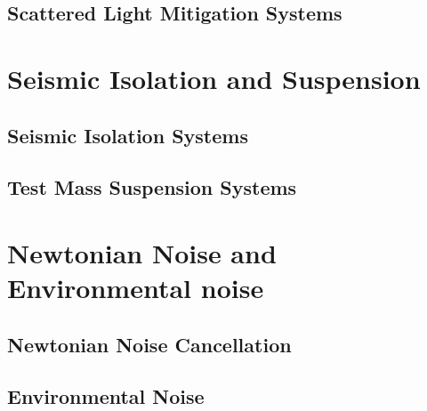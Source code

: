
\subsection{Scattered Light Mitigation Systems}




\section{Seismic Isolation and Suspension}
\label{Sec:SASandSUS}

\subsection{Seismic Isolation Systems}
\label{Sec:SAS}


\subsection{Test Mass Suspension Systems}
\label{Sec:SUS}


\section {Newtonian Noise and Environmental noise}

\subsection {Newtonian Noise Cancellation}
\label{Sec:NewtonianNoise}


\subsection {Environmental Noise}
